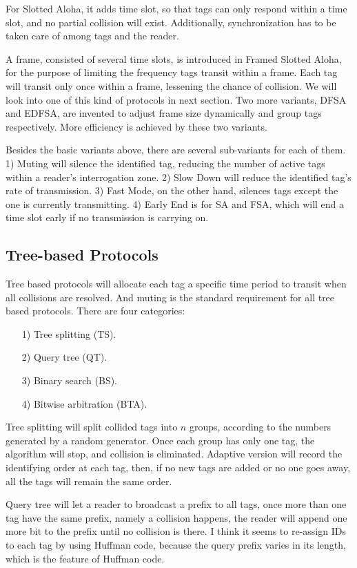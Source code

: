 \documentclass[12pt,letterpaper]{article}
\begin{document}
For Slotted Aloha, it adds time slot, so that tags can only respond
within a time slot, and no partial collision will exist. Additionally,
synchronization has to be taken care of among tags and the reader.

A frame, consisted of several time slots, is introduced in Framed
Slotted Aloha, for the purpose of limiting the frequency tags 
transit within a frame. Each tag will transit only once within a
frame, lessening the chance of collision. We will look into one of
this kind of protocols in next section. Two more variants,
DFSA and EDFSA, are invented to adjust frame size dynamically
and group tags respectively. More efficiency is achieved by these
two variants.

Besides the basic variants above, there are several sub-variants
for each of them. 1) Muting will silence the identified tag, reducing
the number of active tags within a reader's interrogation zone.
2) Slow Down will reduce the identified tag's rate of  transmission. 
3) Fast Mode, on the other hand, silences tags except the one
is currently transmitting. 4) Early End is for SA and FSA, which
will end a time slot early if no transmission is carrying on.

\subsection{Tree-based Protocols}
Tree based protocols will allocate each tag a specific time period
to transit when all collisions are resolved. And muting is the standard
requirement for all tree based protocols. There are four categories:
\begin{itemize}
 \item[1)] Tree splitting (TS).
 \item[2)] Query tree (QT).
 \item[3)] Binary search (BS).
 \item[4)] Bitwise arbitration (BTA).
\end{itemize}

Tree splitting will split collided tags into $n$ groups, according to
the numbers generated by a random generator. Once each group
has only one tag, the algorithm will stop, and collision is eliminated.
Adaptive version will record the identifying order at each tag, then,
if no new tags are added or no one goes away, all the tags will remain
the same order. 

Query tree will let a reader to broadcast a prefix to all tags, once more
than one tag have the same prefix, namely a collision happens, the 
reader will append one more bit to the prefix until no collision is
there. I think it seems to re-assign IDs to each tag by using Huffman
code, because the query prefix varies in its length, which is the 
feature of Huffman code.
\end{document}
